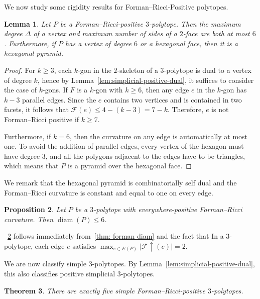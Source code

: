 \documentclass[11pt,a4paper]{amsart}
\newcommand{\diam}{\operatorname{diam}}
\newtheorem{theorem}{Theorem}[section]
\newtheorem{lemma}[theorem]{Lemma}
\newtheorem{proposition}[theorem]{Proposition}
\begin{document}
We now study some rigidity results for Forman--Ricci-Positive polytopes. 

\begin{lemma} \label{lem: 6 bounds}
    Let $P$ be a Forman--Ricci-positive $3$-polytope. Then the maximum degree $\Delta$ of a vertex and maximum number of sides of a $2$-face are both at most $6$. Furthermore, if $P$ has a vertex of degree $6$ or a hexagonal face, then it is a hexagonal pyramid.
\end{lemma}

\begin{proof}
    For $k\geq 3$, each $k$-gon in the $2$-skeleton of a $3$-polytope is dual to a vertex of degree $k$, hence by Lemma~\cref{lem:simplicial-positive-dual}, it suffices to consider the case of $k$-gons. If $F$ is a $k$-gon with $k\ge 6$, then any edge $e$ in the $k$-gon has $k-3$ parallel edges. Since the $e$ contains two vertices and is contained in two facets, it follows that $\mathcal{F}(e)\le 4-(k-3)= 7-k$. Therefore, $e$ is not Forman--Ricci positive if $k\ge 7$. 
    
    Furthermore, if $k=6$, then the curvature on any edge is automatically at most one. To avoid the addition of parallel edges, every vertex of the hexagon must have degree $3$, and all the polygons adjacent to the edges have to be triangles, which means that $P$ is a pyramid over the hexagonal face. 
\end{proof}

We remark that the hexagonal pyramid is combinatorially self dual and the Forman--Ricci curvature is constant and equal to one on every edge.

\begin{proposition}\label{obs: diam = 6}
    Let $P$ be a $3$-polytope with everywhere-positive Forman--Ricci curvature. Then $\diam(P) \leq 6$.
\end{proposition}

~\cref{obs: diam = 6} follows immediately from~\cref{thm: forman diam} and the fact that In a $3$-polytope, each edge $e$ satisfies $\max_{e\in E(P)}|\mathcal{F}\uparrow(e)|=2$.

We are now classify simple $3$-polytopes. By Lemma~\cref{lem:simplicial-positive-dual}, this also classifies positive simplicial $3$-polytopes. 

\begin{theorem}\label{thm: simple 3 polys.}
    There are exactly five simple Forman--Ricci-positive  $3$-polytopes.  
\end{theorem}
\end{document}

